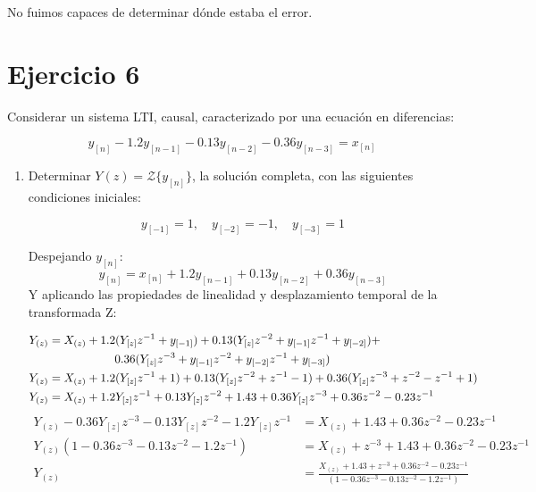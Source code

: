 \documentclass[a4paper,12pt]{report}
\newcommand\myemptypage{
  \newpage
  \null
  \thispagestyle{empty}
  \addtocounter{page}{-1}
  \newpage
}
\begin{document}
\begin{enumerate}[label=\alph*), left=0pt]
    No fuimos capaces de determinar dónde estaba el error.

\end{enumerate}

\myemptypage

\chapter{Ejercicio 6}
Considerar un sistema LTI, causal, caracterizado por una ecuación en diferencias:

\[
  y_{[n]} - 1.2 y_{[n-1]} - 0.13 y_{[n-2]} - 0.36 y_{[n-3]} = x_{[n]}
\]

\begin{enumerate}[label=\alph*), left=0pt]
  \item Determinar $Y(z) = \mathcal{Z}\{y_{[n]}\}$, la solución completa, con las siguientes condiciones iniciales:

    \[
      y_{[-1]} = 1, \quad y_{[-2]} = -1, \quad y_{[-3]} = 1
    \]

    Despejando $y_{[n]}$:
    $$y_{[n]} = x_{[n]} + 1.2 y_{[n-1]} + 0.13 y_{[n-2]} + 0.36 y_{[n-3]} $$
    Y aplicando las propiedades de linealidad y desplazamiento temporal de la transformada Z:

    \begin{align*}
      Y_{(z)} &= X_{(z)} + 1.2 ( Y_{[z]} z^{-1} + y_{[-1]} ) + 0.13 ( Y_{[z]} z^{-2} + y_{[-1]} z^{-1} + y_{[-2]} ) +\\
           &\hspace{20mm} 0.36 (Y_{[z]}z^{-3} + y_{[-1]}z^{-2} +y_{[-2]} z^{-1} + y_{[-3]})\\
      Y_{(z)} &= X_{(z)} + 1.2 ( Y_{[z]}z^{-1} + 1) + 0.13 ( Y_{[z]}z^{-2} + z^{-1} - 1) + 0.36 (Y_{[z]}z^{-3} + z^{-2} - z^{-1} + 1)\\
      Y_{(z)} &= X_{(z)} + 1.2 Y_{[z]}z^{-1}  + 0.13 Y_{[z]}z^{-2} + 1.43 + 0.36Y_{[z]}z^{-3} + 0.36z^{-2} - 0.23 z^{-1} \\
    \end{align*}
    \begin{align*}
      Y_{(z)} - 0.36Y_{[z]}z^{-3} - 0.13 Y_{[z]}z^{-2} - 1.2 Y_{[z]}z^{-1} &= X_{(z)} + 1.43 + 0.36z^{-2} - 0.23 z^{-1}\\
      Y_{(z)} (1 - 0.36z^{-3} - 0.13 z^{-2} - 1.2 z^{-1}) &= X_{(z)} + z^{-3} + 1.43 + 0.36z^{-2} - 0.23 z^{-1}\\
      Y_{(z)}  &= \frac{X_{(z)} + 1.43 + z^{-3} + 0.36z^{-2} - 0.23 z^{-1}}{(1 - 0.36z^{-3} - 0.13 z^{-2} - 1.2 z^{-1})}\\
    \end{align*}


\end{enumerate}
\end{document}
